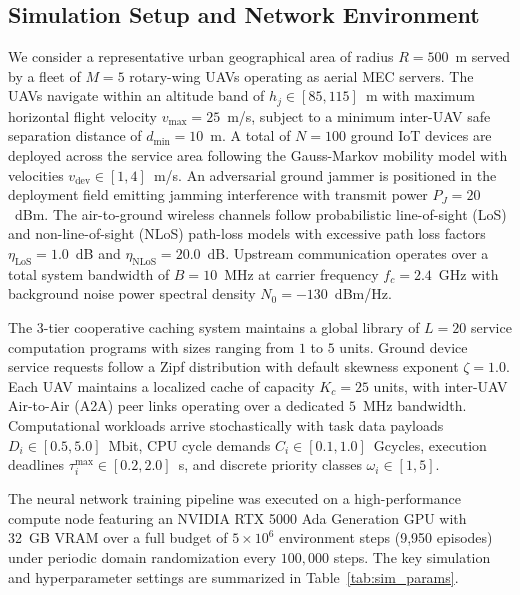 \documentclass[journal]{IEEEtran}
\begin{document}
\subsection{Simulation Setup and Network Environment}
We consider a representative urban geographical area of radius $R = 500$~m served by a fleet of $M = 5$ rotary-wing UAVs operating as aerial MEC servers. The UAVs navigate within an altitude band of $h_j \in [85, 115]$~m with maximum horizontal flight velocity $v_{\max} = 25$~m/s, subject to a minimum inter-UAV safe separation distance of $d_{\min} = 10$~m. A total of $N = 100$ ground IoT devices are deployed across the service area following the Gauss-Markov mobility model with velocities $v_{\mathrm{dev}} \in [1, 4]$~m/s. An adversarial ground jammer is positioned in the deployment field emitting jamming interference with transmit power $P_J = 20$~dBm. The air-to-ground wireless channels follow probabilistic line-of-sight (LoS) and non-line-of-sight (NLoS) path-loss models with excessive path loss factors $\eta_{\mathrm{LoS}} = 1.0$~dB and $\eta_{\mathrm{NLoS}} = 20.0$~dB. Upstream communication operates over a total system bandwidth of $B = 10$~MHz at carrier frequency $f_c = 2.4$~GHz with background noise power spectral density $N_0 = -130$~dBm/Hz.

The 3-tier cooperative caching system maintains a global library of $L = 20$ service computation programs with sizes ranging from $1$ to $5$ units. Ground device service requests follow a Zipf distribution with default skewness exponent $\zeta = 1.0$. Each UAV maintains a localized cache of capacity $K_c = 25$ units, with inter-UAV Air-to-Air (A2A) peer links operating over a dedicated $5$~MHz bandwidth. Computational workloads arrive stochastically with task data payloads $D_i \in [0.5, 5.0]$~Mbit, CPU cycle demands $C_i \in [0.1, 1.0]$~Gcycles, execution deadlines $\tau_i^{\max} \in [0.2, 2.0]$~s, and discrete priority classes $\omega_i \in [1, 5]$.

The neural network training pipeline was executed on a high-performance compute node featuring an NVIDIA RTX 5000 Ada Generation GPU with 32~GB VRAM over a full budget of $5 \times 10^6$ environment steps (9,950 episodes) under periodic domain randomization every $100{,}000$ steps. The key simulation and hyperparameter settings are summarized in Table~\ref{tab:sim_params}.
\end{document}
